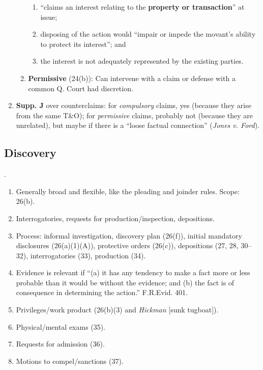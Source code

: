 \begin{enumerate}
\begin{enumerate}
        \begin{enumerate}
            \item ``claims an interest relating to the \textbf{property or 
            transaction}'' at issue;
            \item disposing of the action would ``impair or impede the 
            movant's ability to protect its interest''; and
            \item the interest is not adequately represented by the existing 
            parties.
        \end{enumerate}
        \item \textbf{Permissive} (24(b)): Can intervene with a claim or 
        defense with a common Q. Court had discretion.
    \end{enumerate}
    \item \textbf{Supp. J} over counterclaims: for \emph{compulsory} claims, 
    yes (because they arise from the same T\&O); for \emph{permissive} claims, 
    probably not (because they are unrelated), but maybe if there is a ``loose 
    factual connection'' (\emph{Jones v. Ford}).
\end{enumerate}

\subsection{Discovery}.

\begin{enumerate}
    \item Generally broad and flexible, like the pleading and joinder rules.  
    Scope: 26(b).
    \item Interrogatories, requests for production/inspection, depositions.
    \item Process: informal investigation, discovery plan (26(f)), initial 
    mandatory disclosures (26(a)(1)(A)), protective orders (26(c)), 
    depositions (27, 28, 30--32), interrogatories (33), production (34).
    \item Evidence is relevant if ``(a) it has any tendency to make a fact 
    more or less probable than it would be without the evidence; and (b) the 
    fact is of consequence in determining the action.'' F.R.Evid. 401.
    \item Privileges/work product (26(b)(3) and \emph{Hickman} [sunk 
    tugboat]).
    \item Physical/mental exams (35).
    \item Requests for admission (36).
    \item Motions to compel/sanctions (37).
\end{enumerate}

